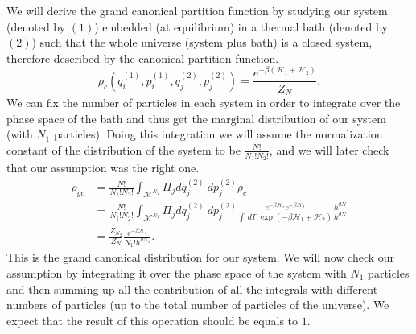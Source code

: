 We will derive the grand canonical partition function by studying our system (denoted by $(1)$) embedded (at equilibrium) in a thermal bath (denoted by $(2)$) such that the whole universe (system plus bath) is a closed system, therefore described by the canonical partition function.
\begin{equation*}
    \rho_c(q_i^{(1)},p_i^{(1)},q_j^{(2)},p_j^{(2)})=\frac{e^{-{\beta(\mathcal{H}_1+\mathcal{H}_2)}}}{Z_N}.
\end{equation*}
We can fix the number of particles in each system in order to integrate over the phase space of the bath and thus get the marginal distribution of our system (with $N_1$ particles). Doing this integration we will assume the normalization constant of the distribution of the system to be $\frac{N!}{N_1!N_2!}$, and we will later check that our assumption was the right one.
\begin{align*}
    \rho_{gc}&=\frac{N!}{N_1!N_2!}\int_{\mathcal{M}^{N_2}}\Pi_{j}dq_j^{(2)}\ dp_j^{(2)}\rho_c\\&=\frac{N!}{N_1!N_2!}\int_{\mathcal{M}^{N_2}}\Pi_{j}dq_j^{(2)}\ dp_j^{(2)}\frac{e^{-\beta\mathcal{H}_1}e^{-\beta\mathcal{H}_2}}{\int\ d\Gamma\ \exp(-\beta{\mathcal{H}_1+\mathcal{H}_2})}\frac{h^{dN}}{h^{dN}}\\&=\frac{Z_{N_2}}{Z_{N}}\frac{e^{-\beta\mathcal{H}_1}}{N_1!h^{dN_1}}.
\end{align*}
This is the grand canonical distribution for our system. We will now check our assumption by integrating it over the phase space of the system with $N_1$ particles and then summing up all the contribution of all the integrals with different numbers of particles (up to the total number of particles of the universe). We expect that the result of this operation should be equals to $1$.
